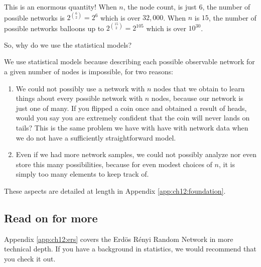 This is an enormous quantity! When $n$, the node count, is just $6$, the number of possible networks is $2^{\binom 6 2} = 2^{6}$ which is over $32,000$. When $n$ is $15$, the number of possible networks balloons up to $2^{\binom{15}{2}} = 2^{105}$ which is over $10^{30}$.

\begin{floatingbox}[h]\caption{So, why do we use the statistical models?}
\label{box:ch5:whyuse}
We use statistical models because describing each possible observable network for a given number of nodes is {impossible}, for two reasons:
\begin{enumerate}
    \item We could not possibly use a network with $n$ nodes that we obtain to learn things about every possible network with $n$ nodes, because our network is just one of many. If you flipped a coin once and obtained a result of heads, would you say you are extremely confident that the coin will never lands on tails? This is the same problem we have with have with network data when we do not have a sufficiently straightforward model.
    \item Even if we had more network samples, we could not possibly analyze nor even store this many possibilities, because for even modest choices of $n$, it is simply too many elements to keep track of.
\end{enumerate}
These aspects are detailed at length in Appendix \ref{app:ch12:foundation}.
\end{floatingbox}

\subsection{Read on for more}

Appendix \ref{app:ch12:ers} covers the Erd\"os R\'enyi Random Network in more technical depth. If you have a background in statistics, we would recommend that you check it out.

\newpage